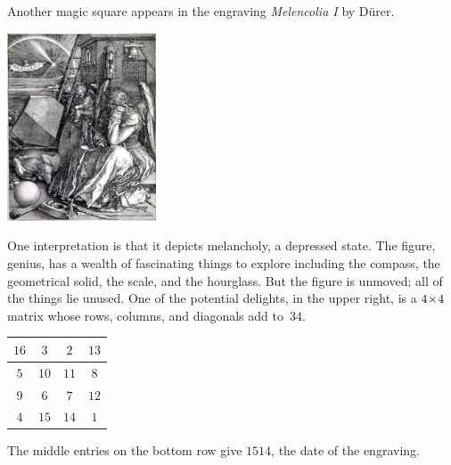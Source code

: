 Another magic square appears in the engraving
\textit{Melencolia I} by D\"urer.
\begin{center}
  \includegraphics[height=2.20in]{Melencolia.jpg} %
\end{center}
One interpretation is that it depicts melancholy, a depressed state.
The figure, genius,
has a wealth of fascinating things to explore including
the compass, the geometrical solid, the scale, and the hourglass.
But the figure is unmoved; all of the things lie unused.
One of the potential delights, in the upper right,
is a $4 \! \times \! 4$ matrix whose
rows, columns, and diagonals add to~$34$.
\begin{center}
  \hspace{.8in}
  \begin{tabular}{|c|c|c|c|}
    \hline
      $16$  &$3$  &$2$  &$13$  \\ \hline
      $5$   &$10$ &$11$ &$8$   \\ \hline
      $9$   &$6$  &$7$  &$12$  \\ \hline    
      $4$   &$15$ &$14$ &$1$  \\ \hline  
  \end{tabular}
\end{center}
The middle entries on the bottom row give $1514$, the 
date of the engraving.

